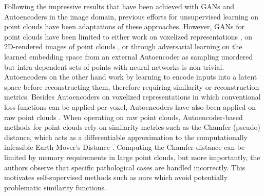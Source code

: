 \documentclass{article}
\begin{document}
Following the impressive results that have been achieved with GANs \cite{gan} and Autoencoders \cite{autoencoder} in the image domain, previous efforts for unsupervised learning on point clouds have been adaptations of these approaches. However, GANs for point clouds have been limited to either work on voxelized representations \cite{3dgan}, on 2D-rendered images of point clouds \cite{vipgan}, or through adversarial learning on the learned embedding space from an external Autoencoder \cite{latentgan} as sampling unordered but intra-dependent sets of points with neural networks is non-trivial. Autoencoders on the other hand work by learning to encode inputs into a latent space before reconstructing them, therefore requiring similarity or reconstruction metrics. Besides Autoencoders on voxelized representations \cite{vconvdae} in which conventional loss functions can be applied per-voxel, Autoencoders have also been applied on raw point clouds \cite{foldingnet, sonet}. When operating on raw point clouds, Autoencoder-based methods for point clouds rely on similarity metrics such as the Chamfer (pseudo) distance, which acts as a differentiable approximation to the computationally infeasible Earth Mover's Distance \cite{earthmovers}. Computing the Chamfer distance can be limited by memory requirements in large point clouds, but more importantly, the authors \cite{latentgan} observe that specific pathological cases are handled incorrectly. This motivates self-supervised methods such as ours which avoid potentially problematic similarity functions.
\end{document}
